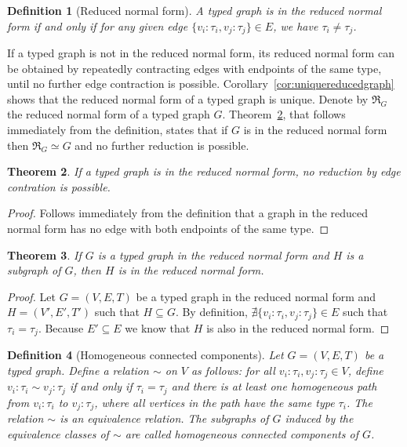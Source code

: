 \documentclass[preprint,12pt]{elsarticle}
\theoremstyle{plain}
\newtheorem{theorem}{Theorem}[section]
\newtheorem{definition}[theorem]{Definition}
\newcommand\tyv[2]{#1\!\!:\!\!#2}
\newcommand\subgraph{\subseteq}
\begin{document}
\begin{definition}[Reduced normal form]
A typed graph is in the reduced normal form if and only if for any given edge $\{\tyv{v_i}{\tau_i}, \tyv{v_j}{\tau_j}\}\in E$,
we have $\tau_i \neq \tau_j$.
\end{definition}

If a typed graph is not in the reduced normal form, its reduced normal form can be obtained by
repeatedly contracting edges with endpoints of the same type, until no further 
edge contraction is possible.
Corollary~\ref{cor:uniquereducedgraph} shows that the reduced normal form of a typed graph is unique.
Denote by $\Re_G$ the reduced normal form of a typed graph $G$.
Theorem~\ref{theorem:noreduction}, that follows immediately from the definition,
states that if $G$ is in the reduced normal form then $\Re_G\simeq G$
and no further reduction is possible.

\begin{theorem}\label{theorem:noreduction}
If a typed graph is in the reduced normal form,
no reduction by edge contration is possible.
\end{theorem}
\begin{proof}
Follows immediately from the definition that
a graph in the reduced normal form has no
edge with both endpoints of the same type.
\end{proof}

\begin{theorem}\label{theorem:reducedsubgraph}
If $G$ is a typed graph in the reduced normal form
and $H$ is a subgraph of $G$, then
$H$ is in the reduced normal form.
\end{theorem}
\begin{proof}
Let $G = (V,E,T)$ be a typed graph in the reduced normal form
and $H = (V',E',T')$ such that $H \subgraph G$.
By definition, $\nexists \{\tyv{v_i}{\tau_i}, \tyv{v_j}{\tau_j}\} \in E$
such that $\tau_i=\tau_j$.
Because $E'\subseteq E$ we know that $H$ is also in the reduced normal form.
\end{proof}

\begin{definition}[Homogeneous connected components]\label{def:connectedcomponent}
Let $G = (V,E,T)$ be a typed graph.
Define a relation $ \sim $ on $V$ as follows: for all $\tyv{v_i}{\tau_i}, \tyv{v_j}{\tau_j} \in V$,
define $\tyv{v_i}{\tau_i} \sim \tyv{v_j}{\tau_j}$ if and only if $\tau_i = \tau_j$ and there is at least one
homogeneous path from $\tyv{v_i}{\tau_i}$ to $\tyv{v_j}{\tau_j}$,
where all vertices in the path have the same type $\tau_i$.
The relation $\sim$ is an equivalence relation.
The subgraphs of $G$ induced by the equivalence classes of $\sim $ are
called \textit{homogeneous connected components} of $G$.
\end{definition}
\end{document}
